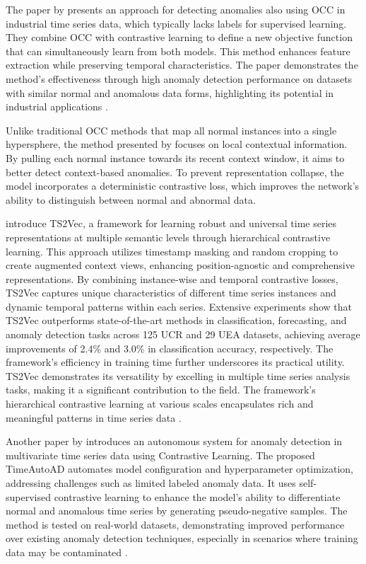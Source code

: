 %
The paper by  presents an approach for detecting anomalies also using OCC in industrial time series data, which typically lacks labels for supervised learning. They combine OCC with contrastive learning to define a new objective function that can simultaneously learn from both models. This method enhances feature extraction while preserving temporal characteristics. The paper demonstrates the method's effectiveness through high anomaly detection performance on datasets with similar normal and anomalous data forms, highlighting its potential in industrial applications .

Unlike traditional OCC methods that map all normal instances into a single hypersphere, the method presented by  focuses on local contextual information. By pulling each normal instance towards its recent context window, it aims to better detect context-based anomalies. To prevent representation collapse, the model incorporates a deterministic contrastive loss, which improves the network's ability to distinguish between normal and abnormal data.

 introduce TS2Vec, a framework for learning robust and universal time series representations at multiple semantic levels through hierarchical contrastive learning. This approach utilizes timestamp masking and random cropping to create augmented context views, enhancing position-agnostic and comprehensive representations. By combining instance-wise and temporal contrastive losses, TS2Vec captures unique characteristics of different time series instances and dynamic temporal patterns within each series. Extensive experiments show that TS2Vec outperforms state-of-the-art methods in classification, forecasting, and anomaly detection tasks across 125 UCR and 29 UEA datasets, achieving average improvements of 2.4\% and 3.0\% in classification accuracy, respectively. The framework's efficiency in training time further underscores its practical utility. TS2Vec demonstrates its versatility by excelling in multiple time series analysis tasks, making it a significant contribution to the field. The framework's hierarchical contrastive learning at various scales encapsulates rich and meaningful patterns in time series data .

Another paper by  introduces an autonomous system for anomaly detection in multivariate time series data using Contrastive Learning. The proposed TimeAutoAD automates model configuration and hyperparameter optimization, addressing challenges such as limited labeled anomaly data. It uses self-supervised contrastive learning to enhance the model's ability to differentiate normal and anomalous time series by generating pseudo-negative samples. The method is tested on real-world datasets, demonstrating improved performance over existing anomaly detection techniques, especially in scenarios where training data may be contaminated .

